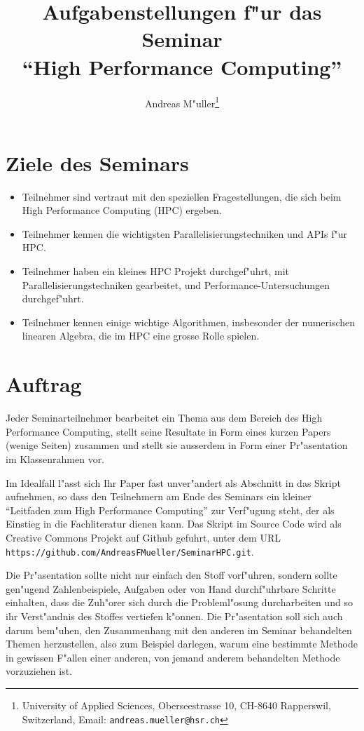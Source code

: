 \documentclass[a4paper,12pt]{article}
\begin{document}
\title{Aufgabenstellungen f"ur das Seminar\\``High Performance Computing''}
\author{Andreas M"uller\footnote{
University of Applied Sciences, Oberseestrasse 10, CH-8640 Rapperswil,
Switzerland, Email: {\tt andreas.mueller@hsr.ch}}}
\date{}
\maketitle
\section{Ziele des Seminars}
\begin{itemize}
\item Teilnehmer sind vertraut mit den speziellen Fragestellungen, die
sich beim High Performance Computing (HPC) ergeben.
\item Teilnehmer kennen die wichtigsten Parallelisierungstechniken und
APIs f"ur HPC.
\item Teilnehmer haben ein kleines HPC Projekt durchgef"uhrt, mit
Parallelisierungstechniken gearbeitet, und Performance-Untersuchungen
durchgef"uhrt.
\item Teilnehmer kennen einige wichtige Algorithmen, insbesonder der
numerischen linearen Algebra, die im HPC eine grosse Rolle spielen.
\end{itemize}

\section{Auftrag}
Jeder Seminarteilnehmer bearbeitet ein Thema aus dem Bereich des
High Performance Computing,
stellt seine Resultate in Form eines
kurzen Papers (wenige Seiten) zusammen und stellt sie ausserdem
in Form einer Pr"asentation im Klassenrahmen vor.

Im Idealfall l"asst sich Ihr Paper fast unver"andert als Abschnitt
in das Skript aufnehmen, so dass den Teilnehmern am Ende des Seminars
ein kleiner ``Leitfaden zum High Performance Computing'' zur Verf"ugung steht,
der als Einstieg in die Fachliteratur dienen kann.
Das Skript im Source Code wird als Creative Commons Projekt auf
Github gefuhrt, unter dem URL
{\tt https://github.com/AndreasFMueller/SeminarHPC.git}.

Die Pr"asentation sollte nicht nur einfach den Stoff vorf"uhren,
sondern sollte gen"ugend Zahlenbeispiele, Aufgaben oder von Hand
durchf"uhrbare Schritte einhalten, dass die Zuh"orer sich durch
die Probleml"osung durcharbeiten und so ihr Verst"andnis des
Stoffes vertiefen k"onnen. Die Pr"asentation soll sich auch darum
bem"uhen, den Zusammenhang mit den anderen im Seminar behandelten
Themen herzustellen, also zum Beispiel darlegen, warum eine bestimmte
Methode in gewissen F"allen einer anderen, von jemand anderem behandelten
Methode vorzuziehen ist.
\end{document}
